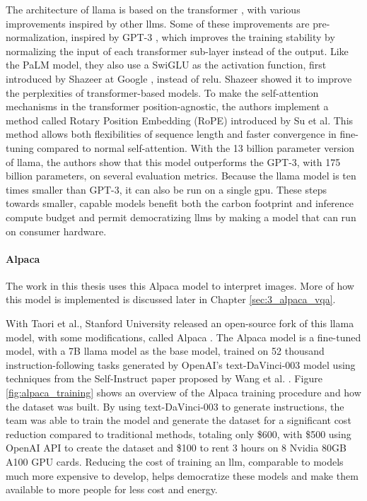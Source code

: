     
    The architecture of \gls{llama} is based on the transformer \cite{vaswaniAttentionAllYou2017}, with various improvements inspired by other \glspl{llm}. Some of these improvements are pre-normalization, inspired by GPT-3 \cite{brownLanguageModelsAre2020}, which improves the training stability by normalizing the input of each transformer sub-layer instead of the output. Like the PaLM model, they also use a SwiGLU as the activation function, first introduced by Shazeer at Google \cite{shazeerGLUVariantsImprove2020}, instead of \gls{relu}. Shazeer showed it to improve the perplexities of transformer-based models. To make the self-attention mechanisms in the transformer position-agnostic, the authors implement a method called Rotary Position Embedding (RoPE) introduced by Su et al. This method allows both flexibilities of sequence length and faster convergence in fine-tuning compared to normal self-attention. With the 13 billion parameter version of \gls{llama}, the authors show that this model outperforms the GPT-3, with 175 billion parameters, on several evaluation metrics. Because the \gls{llama} model is ten times smaller than GPT-3, it can also be run on a single \gls{gpu}. These steps towards smaller, capable models benefit both the carbon footprint and inference compute budget and permit democratizing \glspl{llm} by making a model that can run on consumer hardware.

    \paragraph{Alpaca\\}
    The work in this thesis uses this Alpaca model to interpret images. More of how this model is implemented is discussed later in Chapter \ref{sec:3_alpaca_vqa}.
    
    With Taori et al., Stanford University released an open-source fork of this \gls{llama} model, with some modifications, called Alpaca \cite{taoriStanfordCRFM, taoriStanfordAlpacaInstructionfollowing2023}. The Alpaca model is a fine-tuned model, with a 7B \gls{llama} model as the base model, trained on 52 thousand instruction-following tasks generated by OpenAI's text-DaVinci-003 model \cite{OpenAIAPI} using techniques from the Self-Instruct paper proposed by Wang et al. \cite{wangSelfInstructAligningLanguage2022}. Figure \ref{fig:alpaca_training} shows an overview of the Alpaca training procedure and how the dataset was built. By using text-DaVinci-003 to generate instructions, the team was able to train the model and generate the dataset for a significant cost reduction compared to traditional methods, totaling only \$600, with \$500 using OpenAI API to create the dataset and \$100 to rent 3 hours on 8 Nvidia 80GB A100 GPU cards. Reducing the cost of training an \gls{llm}, comparable to models much more expensive to develop, helps democratize these models and make them available to more people for less cost and energy.

